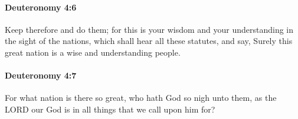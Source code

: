 		\paragraph{Deuteronomy 4:6} %
			\label{DEUTERONOMY-4-6}

			Keep therefore and do them; for this is your wisdom and your understanding in the sight of the nations, which shall hear all these statutes, and say, Surely this great nation is a wise and understanding people.


		\paragraph{Deuteronomy 4:7} %
			\label{DEUTERONOMY-4-7}

			For what nation is there so great, who hath God so nigh unto them, as the LORD our God is in all things that we call upon him for?


